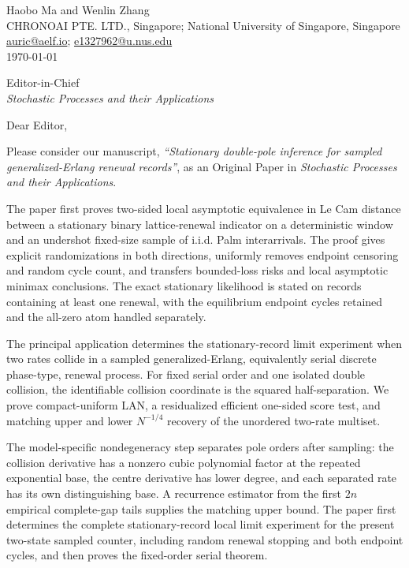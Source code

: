 \documentclass[11pt]{article}
\begin{document}
\begin{flushright}
Haobo Ma and Wenlin Zhang\\
CHRONOAI PTE. LTD., Singapore; National University of Singapore, Singapore\\
\href{mailto:auric@aelf.io}{auric@aelf.io};
\href{mailto:e1327962@u.nus.edu}{e1327962@u.nus.edu}\\
\today
\end{flushright}

Editor-in-Chief\\
\emph{Stochastic Processes and their Applications}

Dear Editor,

Please consider our manuscript, \emph{``Stationary double-pole inference for
sampled generalized-Erlang renewal records''}, as an Original Paper in
\emph{Stochastic Processes and their Applications}.

The paper first proves two-sided local asymptotic equivalence in Le Cam
distance between a stationary binary lattice-renewal indicator on a
deterministic window and an undershot fixed-size sample of i.i.d. Palm
interarrivals.  The proof gives explicit randomizations in both directions,
uniformly removes endpoint censoring and random cycle count, and transfers
bounded-loss risks and local asymptotic minimax conclusions.  The exact
stationary likelihood is stated on records containing at least one renewal,
with the equilibrium endpoint cycles retained and the all-zero atom handled
separately.

The principal application determines the stationary-record limit experiment
when two rates collide in a sampled generalized-Erlang, equivalently serial
discrete phase-type, renewal process.  For fixed serial order and one isolated
double collision, the identifiable collision coordinate is the squared
half-separation.  We prove compact-uniform LAN, a residualized efficient
one-sided score test, and matching upper and lower \(N^{-1/4}\) recovery of
the unordered two-rate multiset.

The model-specific nondegeneracy step separates pole orders after sampling:
the collision derivative has a nonzero cubic polynomial factor at the repeated
exponential base, the centre derivative has lower degree, and each separated
rate has its own distinguishing base.  A recurrence estimator from the first
\(2n\) empirical complete-gap tails supplies the matching upper bound.  The
paper first determines the complete stationary-record local limit experiment
for the present two-state sampled counter, including random renewal stopping
and both endpoint cycles, and then proves the fixed-order serial theorem.
\end{document}

